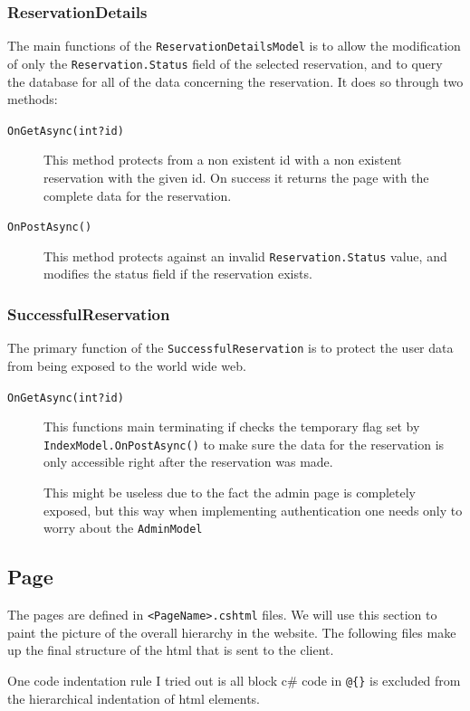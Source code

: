 \documentclass[12pt, a4paper]{article}
\begin{document}
\subsubsection{ReservationDetails}
The main functions of the \texttt{ReservationDetailsModel} is to allow the modification of only the \texttt{Reservation.Status} field of the selected reservation, and to query the database for all of the data concerning the reservation. It does so through two methods:
\begin{description}
    \item[\texttt{OnGetAsync(int?\;id)}] This method protects from a non existent id with a non existent reservation with the given id. On success it returns the page with the complete data for the reservation.
    \item[\texttt{OnPostAsync()}] This method protects against an invalid \texttt{Reservation.Status} value, and modifies the status field if the reservation exists.
\end{description}

\subsubsection{SuccessfulReservation}
The primary function of the \texttt{SuccessfulReservation} is to protect the user data from being exposed to the world wide web.
\begin{description}
    \item[\texttt{OnGetAsync(int?\;id)}] This functions main terminating if checks the temporary flag set by \texttt{IndexModel.OnPostAsync()} to make sure the data for the reservation is only accessible right after the reservation was made.
    
    This might be useless due to the fact the admin page is completely exposed, but this way when implementing authentication one needs only to worry about the \texttt{AdminModel}
\end{description}

\subsection{Page}
The pages are defined in \texttt{<PageName>.cshtml} files. We will use this section to paint the picture of the overall hierarchy in the website. The following files make up the final structure of the html that is sent to the client.

One code indentation rule I tried out is all block c\# code in \texttt{@\{\}} is excluded from the hierarchical indentation of html elements.
\end{document}
